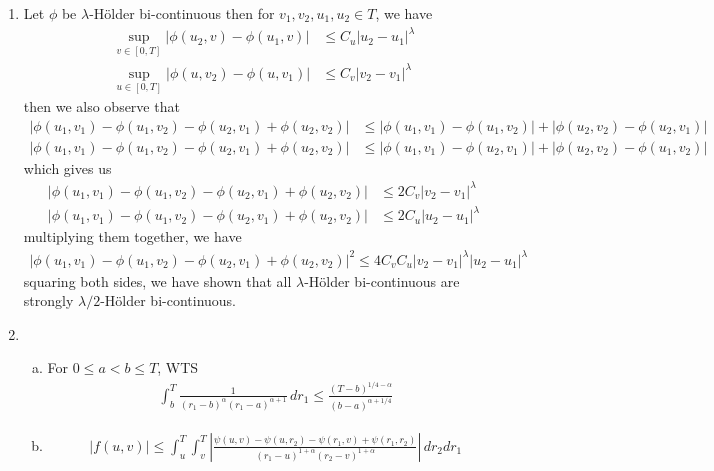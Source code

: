\documentclass[a4paper,12pt]{article}
\theoremstyle{definition}
\begin{document}
\begin{enumerate}
\item Let $\phi$ be $\lambda$-H\"{o}lder bi-continuous then for $v_1, v_2, u_1, u_2 \in T$, we have
\begin{align*}
\sup_{v \in [0,T]}|\phi(u_2,v)-\phi(u_1,v)| &\leq C_u|u_2-u_1|^\lambda\\
\sup_{u \in [0,T]}|\phi(u,v_2)-\phi(u,v_1)| &\leq C_v|v_2-v_1|^\lambda
\end{align*}
then we also observe that 
\begin{align*}
|\phi(u_1,v_1)-\phi(u_1,v_2)-\phi(u_2,v_1)+\phi(u_2,v_2)| &\leq |\phi(u_1,v_1)-\phi(u_1,v_2)|+|\phi(u_2,v_2)-\phi(u_2,v_1)| \\
|\phi(u_1,v_1)-\phi(u_1,v_2)-\phi(u_2,v_1)+\phi(u_2,v_2)| &\leq |\phi(u_1,v_1)-\phi(u_2,v_1)|+|\phi(u_2,v_2)-\phi(u_1,v_2)|
\end{align*}
which gives us 
\begin{align*}
|\phi(u_1,v_1)-\phi(u_1,v_2)-\phi(u_2,v_1)+\phi(u_2,v_2)| &\leq 2C_v|v_2-v_1|^\lambda \\
|\phi(u_1,v_1)-\phi(u_1,v_2)-\phi(u_2,v_1)+\phi(u_2,v_2)| &\leq 2C_u|u_2-u_1|^\lambda
\end{align*}
multiplying them together, we have 
\begin{align*}
|\phi(u_1,v_1)-\phi(u_1,v_2)-\phi(u_2,v_1)+\phi(u_2,v_2)|^2 \leq 4C_vC_u|v_2-v_1|^\lambda |u_2-u_1|^\lambda
\end{align*}
squaring both sides, we have shown that all $\lambda$-H\"{o}lder bi-continuous are strongly $\lambda/2$-H\"{o}lder bi-continuous.



\item
\begin{enumerate}[(a)]
\item For $0 \leq a < b \leq T$, WTS
\begin{align*}
\int_{b}^{T}\frac{1}{(r_1-b)^\alpha(r_1-a)^{\alpha+1}}\,dr_1 \leq \frac{(T-b)^{1/4-\alpha}}{(b-a)^{\alpha+1/4}}
\end{align*}

\item 
\begin{align*}
|f(u,v)| \leq \int_{u}^{T}\int_{v}^{T}\left|\frac{\psi(u,v)-\psi(u,r_2)-\psi(r_1,v)+\psi(r_1,r_2)}{(r_1-u)^{1+\alpha}(r_2-v)^{1+\alpha}}\right|\,dr_2dr_1
\end{align*}
\end{enumerate}


\end{enumerate}
\end{document}

